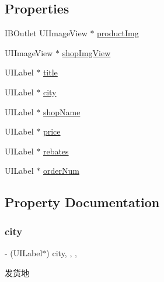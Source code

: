 \subsection*{Properties}
\begin{DoxyCompactItemize}
\item 
I\+B\+Outlet U\+I\+Image\+View $\ast$ \mbox{\hyperlink{interface_t_b_order_cell_aeb04abb0f859d3694926346bc491d014}{product\+Img}}
\item 
U\+I\+Image\+View $\ast$ \mbox{\hyperlink{interface_t_b_order_cell_a3e21f49b53100a5d19624efa9a271c65}{shop\+Img\+View}}
\item 
U\+I\+Label $\ast$ \mbox{\hyperlink{interface_t_b_order_cell_a067c67e5c2065df2be5ef31bfbd30ec4}{title}}
\item 
U\+I\+Label $\ast$ \mbox{\hyperlink{interface_t_b_order_cell_af23c95f6da02475df5a97ebd573e1ae7}{city}}
\item 
U\+I\+Label $\ast$ \mbox{\hyperlink{interface_t_b_order_cell_a1efe3494eb8c26f629ccf562009f6bea}{shop\+Name}}
\item 
U\+I\+Label $\ast$ \mbox{\hyperlink{interface_t_b_order_cell_aed58c8a3678690f579e94e5b882027ec}{price}}
\item 
U\+I\+Label $\ast$ \mbox{\hyperlink{interface_t_b_order_cell_ab598f0f9ee1233aa6452c5a8d21f1d40}{rebates}}
\item 
U\+I\+Label $\ast$ \mbox{\hyperlink{interface_t_b_order_cell_a876690f5aef1994ba8c0f93d451d5689}{order\+Num}}
\end{DoxyCompactItemize}


\subsection{Property Documentation}
\mbox{\label{interface_t_b_order_cell_af23c95f6da02475df5a97ebd573e1ae7}} 
\subsubsection{\texorpdfstring{city}{city}}
{\footnotesize\ttfamily -\/ (U\+I\+Label$\ast$) city\hspace{0.3cm}{\ttfamily [read]}, {\ttfamily [write]}, {\ttfamily [nonatomic]}, {\ttfamily [strong]}}

发货地 \mbox{\label{interface_t_b_order_cell_a876690f5aef1994ba8c0f93d451d5689}} 
